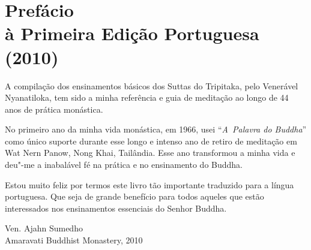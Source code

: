 \chapter[Prefácio à Primeira Edição Portuguesa (2010)]{Prefácio\\ à Primeira Edição Portuguesa\\ (2010)}

A compilação dos ensinamentos básicos dos Suttas do Tripitaka, pelo Venerável
Nyanatiloka, tem sido a minha referência e guia de meditação ao longo de 44 anos
de prática monástica.

No primeiro ano da minha vida monástica, em 1966, usei ``\emph{A~\mbox{Palavra} do
  Buddha}'' como único suporte durante esse longo e intenso ano de retiro de
meditação em Wat Nern Panow, Nong Khai, Tailândia. Esse ano transformou a minha
vida e deu"-me a inabalável fé na prática e no ensinamento do Buddha.

Estou muito feliz por termos este livro tão importante traduzido para a língua
portuguesa. Que seja de grande benefício para todos aqueles que estão
interessados nos ensinamentos essenciais do Senhor Buddha.

\bigskip

{\raggedleft
  Ven. Ajahn Sumedho\\
  Amaravati Buddhist Monastery, 2010
\par}
